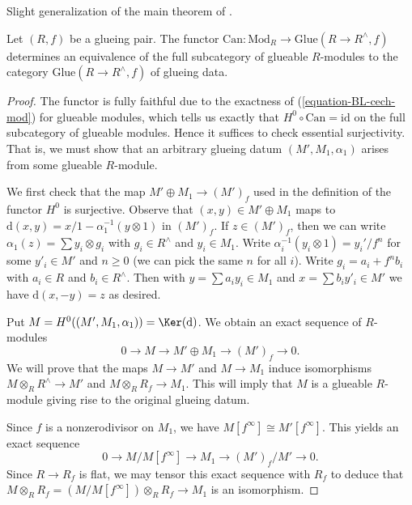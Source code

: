 \begin{theorem}
\label{theorem-BL-glueing}
\begin{reference}
Slight generalization of the main theorem of \cite{Beauville-Laszlo}.
\end{reference}
Let $(R,f)$ be a glueing pair. The functor
$\text{Can} : \text{Mod}_R \longrightarrow \text{Glue}(R \to R^\wedge, f)$
determines an equivalence of the full subcategory of glueable $R$-modules
to the category $\text{Glue}(R \to R^\wedge, f)$ of glueing data.
\end{theorem}

\begin{proof}
The functor is fully faithful due to the exactness of
(\ref{equation-BL-cech-mod}) for glueable modules, which tells
us exactly that $H^0 \circ \text{Can} = \text{id}$ on the
full subcategory of glueable modules.
Hence it suffices to check essential surjectivity.
That is, we must show that an arbitrary glueing datum
$(M', M_1, \alpha_1)$ arises from some glueable $R$-module.

\medskip\noindent
We first check that the map $M' \oplus M_1 \to (M')_f$ used in the
definition of the functor $H^0$ is surjective. Observe that
$(x, y) \in M' \oplus M_1$ maps to
$\text{d}(x, y) = x/1 - \alpha_1^{-1}(y \otimes 1)$
in $(M')_f$. If $z \in (M')_f$, then we can write
$\alpha_1(z) = \sum y_i \otimes g_i$ with $g_i \in R^\wedge$
and $y_i \in M_1$. Write $\alpha_i^{-1}(y_i \otimes 1) = y_i'/f^n$
for some $y'_i \in M'$ and $n \geq 0$ (we can pick the same $n$
for all $i$). Write $g_i = a_i + f^n b_i$ with $a_i \in R$ and
$b_i \in R^\wedge$. Then with $y = \sum a_i y_i \in M_1$ and
$x = \sum b_i y'_i \in M'$ we have $\text{d}(x, -y) = z$
as desired.

\medskip\noindent
Put $M = H^0((M', M_1, \alpha_1)) = \Ker(\text{d})$. We obtain 
an exact sequence of $R$-modules
\begin{equation}
\label{equation-define-M}
0 \to M \to M' \oplus M_1 \to (M')_f \to 0.
\end{equation}
We will prove that the maps $M \to M'$ and $M \to M_1$ induce isomorphisms
$M \otimes_R R^\wedge \to M'$ and $M \otimes_R R_f \to M_1$.
This will imply  that $M$ is a glueable $R$-module giving rise to the
original glueing datum.

\medskip\noindent
Since $f$ is a nonzerodivisor on $M_1$, we have
$M[f^\infty] \cong M'[f^\infty]$. This yields an exact sequence
\begin{equation}
\label{equation-exact-mod-torsion}
0 \to M/M[f^\infty] \to M_1 \to (M')_f/M' \to 0.
\end{equation}
Since $R \to R_f$ is flat, we may tensor this exact sequence with $R_f$
to deduce that $M \otimes_R R_f = (M/M[f^\infty]) \otimes_R R_f \to M_1$
is an isomorphism. 


\end{proof}
